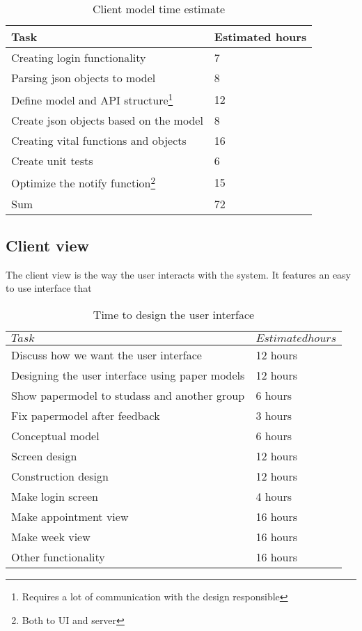 \documentclass[a4paper, english, 12pt]{article}
\begin{document}
 \begin{table}[h]
    \begin{center}
    \caption{Client model time estimate} 
    \label{clientmodel}
    \vspace{0,5cm}
    \begin{tabular}{ll} \\ 
        \hline
        Task & Estimated hours\\
        \hline 
    Creating login functionality & 7 \\
    Parsing json objects to model & 8 \\
    Define model and API structure\footnote{Requires a lot of communication with the design responsible}  & 12\\
    Create json objects based on the model & 8 \\
    Creating vital functions and objects & 16 \\
    Create unit tests & 6 \\
    Optimize the notify function\footnote{Both to UI and server} & 15 \\    
        \hline
    Sum & 72\\
    \hline
    \end{tabular}
    \end{center}
\end{table}



\subsection{Client view}
The client view is the way the user interacts with the system. It features an easy to use interface that 

\begin{table}[h]
    \begin{center}
    \caption{Time to design the user interface} 
    \label{UI}
    \vspace{0,5cm}
    \begin{tabular}{ll} \\ 
        \hline
        $Task$ & $Estimated hours$\\
        \hline 
    Discuss how we want the user interface & 12 hours\\
    Designing the user interface using paper models & 12 hours\\    
    Show papermodel to studass and another group & 6 hours\\
    Fix papermodel after feedback & 3 hours\\
    Conceptual model & 6 hours\\
    Screen design & 12 hours\\
    Construction design & 12 hours\\
    Make login screen & 4 hours\\
    Make appointment view & 16 hours\\
    Make week view & 16 hours\\
    Other functionality & 16 hours\\
        \hline
    \end{tabular}
    \end{center}
\end{table}
\end{document}
